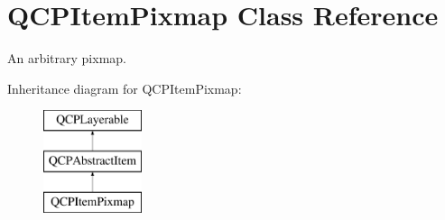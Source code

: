 \hypertarget{classQCPItemPixmap}{\section{\-Q\-C\-P\-Item\-Pixmap \-Class \-Reference}
\label{classQCPItemPixmap}
}


\-An arbitrary pixmap.  


\-Inheritance diagram for \-Q\-C\-P\-Item\-Pixmap\-:\begin{figure}[H]
\begin{center}
\leavevmode
\includegraphics[height=3.000000cm]{classQCPItemPixmap}
\end{center}
\end{figure}
